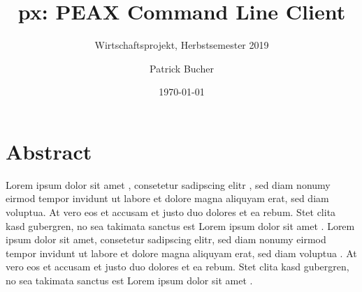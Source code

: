 \author{Patrick Bucher}
\title{px: PEAX Command Line Client}
\subtitle{Wirtschaftsprojekt, Herbstsemester 2019}
\date{\today}
\maketitle

\section*{Abstract}

Lorem ipsum dolor sit amet \cite[p. 99]{unixart}, consetetur sadipscing elitr \cite[p. 101]{cleanarch}, sed diam nonumy eirmod tempor invidunt ut labore et dolore magna aliquyam erat, sed diam voluptua. At vero eos et accusam et justo duo dolores et ea rebum. Stet clita kasd gubergren, no sea takimata sanctus est Lorem ipsum dolor sit amet \cite[p. 99]{testing}. Lorem ipsum dolor sit amet, consetetur sadipscing elitr, sed diam nonumy eirmod tempor invidunt ut labore et dolore magna aliquyam erat, sed diam voluptua \cite[p. 88]{unixphil}. At vero eos et accusam et justo duo dolores et ea rebum. Stet clita kasd gubergren, no sea takimata sanctus est Lorem ipsum dolor sit amet \cite[p. 23]{gopl}.
